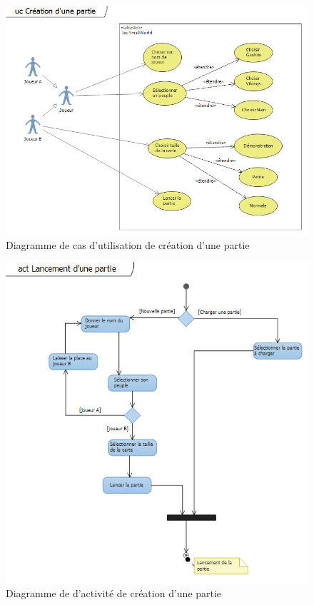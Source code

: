 \documentclass[a4paper]{article}%
\begin{document}
\begin{figure}[H]
    \centering
    \includegraphics[width=\textwidth]{./images/cas_dutilisation/creerpartie.png}
		\caption{Diagramme de cas d'utilisation de création d'une partie}
		\label{fig:cas_creerpartie}
\end{figure}

\begin{figure}[H]
    \centering
    \includegraphics[width=\textwidth]{./images/interaction/creerpartie.png}
		\caption{Diagramme de d'activité de création d'une partie}
		\label{fig:inter_creerpartie}
\end{figure}
\end{document}
